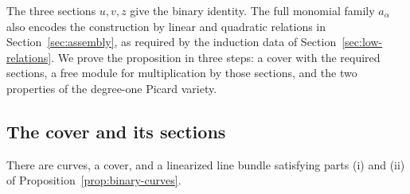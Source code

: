 The three sections \(u,v,z\) give the binary identity. The full monomial
family \(a_\alpha\) also encodes the construction by linear and quadratic
relations in Section~\ref{sec:assembly}, as required by the induction
data of Section~\ref{sec:low-relations}.
We prove the proposition in three steps: a cover with the required
sections, a free module for multiplication by those sections, and the
two properties of the degree-one Picard variety.

\subsection{The cover and its sections}

\begin{lemma}\label{lem:binary-cover}
There are curves, a cover, and a linearized line bundle satisfying
parts \textup{(i)} and \textup{(ii)} of
Proposition~\ref{prop:binary-curves}.
\end{lemma}

